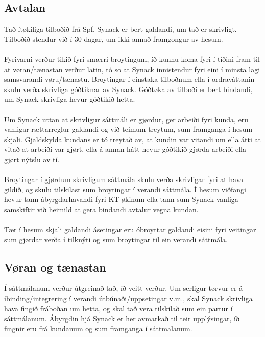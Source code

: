 \subsection{Avtalan}
Tað ítøkiliga tilboðið frá Spf. Synack er bert galdandi, um tað er skrivligt. Tilboðið stendur við í 30 dagar, um ikki annað framgongur av hesum. \\ \\
Fyrivarni verður tikið fyri smærri broytingum, íð kunnu koma fyri í tíðini fram til at vøran/tænastan verður latin, tó so at Synack innistendur fyri eini í minsta lagi samsvarandi vøru/tænastu. Broytingar í einstaka tilboðnum ella í ordraváttanin skulu verða skrivliga góðtiknar av Synack. Góðtøka av tilboði er bert bindandi, um Synack skrivliga hevur góðtikið hetta. \\ \\
Um Synack uttan at skrivligur sáttmáli er gjørdur, ger arbeiði fyri kunda, eru vanligar rættarreglur galdandi og við teimum treytum, sum framganga í hesum skjali. Gjaldskylda kundans er tó treytað av, at kundin var vitandi um ella átti at vitað at arbeiði var gjørt, ella á annan hátt hevur góðtikið gjørda arbeiði ella gjørt nýtslu av tí. \\ \\
Broytingar í gjørdum skrivligum sáttmála skulu verða skrivligar fyri at hava gildið, og skulu tilskilast sum broytingar í verandi sáttmála. Í hesum viðfangi hevur tann ábyrgdarhavandi fyri KT-økinum ella tann sum Synack vanliga samskiftir við heimild at gera bindandi avtalur vegna kundan. \\ \\
Tær í hesum skjali galdandi ásetingar eru óbroyttar galdandi eisini fyri veitingar sum gjørdar verða í tilknýti og sum broytingar til ein verandi sáttmála.

\subsection{Vøran og tænastan}
Í sáttmálanum verður útgreinað tað, íð veitt verður. Um serligur tørvur er á íbinding/integrering í verandi útbúnaði/uppsetingar v.m., skal Synack skrivliga hava fingið fráboðan um hetta, og skal tað vera tilskilað sum ein partur í sáttmálanum. Ábyrgdin hjá Synack er her avmarkað til teir upplýsingar, íð fingnir eru frá kundanum og sum framganga í sáttmalanum.

